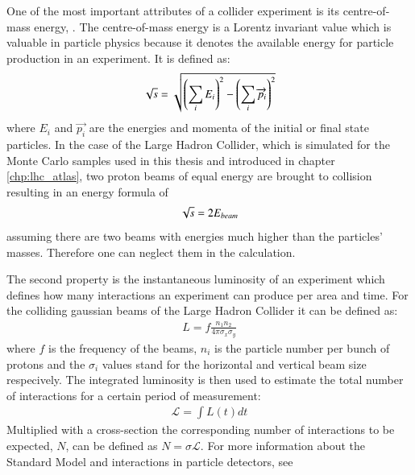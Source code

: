 One of the most important attributes of a collider experiment is its centre-of-mass energy, \Ecms. The centre-of-mass energy is a Lorentz invariant value which is valuable in particle physics because it denotes the available energy for particle production in an experiment.
It is defined as:
%
\begin{align}
\sqrt{s} = \sqrt{ \left( \sum_i E_i \right)^2 - \left( \sum_i \overrightarrow{p_i} \right)^2 }
\end{align}
%
where $E_i$ and $\overrightarrow{p_i}$ are the energies and momenta of the initial or final state particles.
In the case of the Large Hadron Collider, which is simulated for the Monte Carlo samples used in this thesis and introduced in chapter \ref{chp:lhc_atlas}, two proton beams of equal energy are brought to collision resulting in an energy formula of
%
\begin{align}
\sqrt{s} = 2 E_{beam}
\end{align}
%
assuming there are two beams with energies much higher than the particles' masses. Therefore one can neglect them in the calculation.

The second property is the instantaneous luminosity of an experiment which defines how many interactions an experiment can produce per area and time. For the colliding gaussian beams of the Large Hadron Collider it can be defined as:
%
\begin{align}
L =f \frac{n_1 n_2}{4 \pi \sigma_x \sigma_y}
\end{align}
%
where $f$ is the frequency of the beams, $n_i$ is the particle number per bunch of protons and the $\sigma_i$ values stand for the horizontal and vertical beam size respecively.
The integrated luminosity is then used to estimate the total number of interactions for a certain period of measurement:
%
\begin{align}
\mathcal{L} = \int L(t) dt
\end{align}
%
Multiplied with a cross-section the corresponding number of interactions to be expected, $N$, can be defined as $N = \sigma \mathcal{L}$.
For more information about the Standard Model and interactions in particle detectors, see ~\cite{thomson, griffiths}

